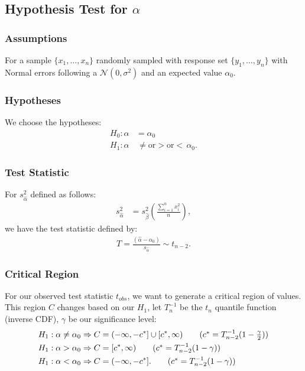 \documentclass[a4paper, 12pt, twoside]{article}
\begin{document}
\newpage

\subsection{Hypothesis Test for $\alpha$}

\subsubsection{Assumptions}

For a sample $\{x_1, \ldots, x_n\}$ randomly sampled with response
set $\{y_1, \ldots, y_n\}$ with Normal errors following a
$\mathcal{N}(0, \sigma^2)$ and an expected value $\alpha_0$.

\subsubsection{Hypotheses}

We choose the hypotheses:
\begin{align*}
    H_0 : \alpha & = \alpha_0                                   \\
    H_1 : \alpha & \, \neq \text{or} > \text{or} < \, \alpha_0.
\end{align*}

\subsubsection{Test Statistic}

For $s_{\hat\alpha}^2$ defined as follows:
\begin{align*}
    s_{\hat\alpha}^2 & = s_{\hat\beta}^2
    \left(\frac{\sum_{i = 1}^n x_i^2}{n}\right),
\end{align*}
we have the test statistic defined by:
\begin{align*}
    T = \frac{(\hat\alpha - \alpha_0)}{s_{\hat\alpha}}
    \sim t_{n - 2}.
\end{align*}

\subsubsection{Critical Region}

For our observed test statistic $t_{obs}$, we want to generate a
critical region of values. This region $C$ changes based on our
$H_1$, let $T^{-1}_n$ be the $t_n$ quantile function
(inverse CDF), $\gamma$ be our significance level:
\begin{align*}
    H_1 : \alpha \neq \alpha_0 & \Rightarrow
    C = (-\infty, -c^*] \cup [c^*, \infty)
    \tag{$ c^* = T_{n-2}^{-1}(1 - \frac{\gamma}{2}) $} \\
    H_1 : \alpha > \alpha_0    & \Rightarrow
    C = [c^*, \infty)
    \tag{$ c^* = T_{n-2}^{-1}(1 - \gamma) $}           \\
    H_1 : \alpha < \alpha_0    & \Rightarrow
    C = (-\infty, -c^*].
    \tag{$ c^* = T_{n-2}^{-1}(1 - \gamma) $}
\end{align*}
\end{document}

